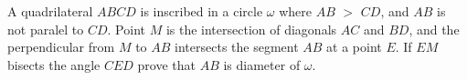 A quadrilateral $ABCD$ is inscribed in a circle $\omega$ where $AB$ $>$ $CD$, and $AB$ is not paralel to $CD$. Point $M$ is the intersection of diagonals $AC$ and $BD$,  and the perpendicular from $M$ to $AB$ intersects the segment $AB$ at a point $E$. If $EM$ bisects the angle $CED$ prove that $AB$ is diameter of $\omega$.

